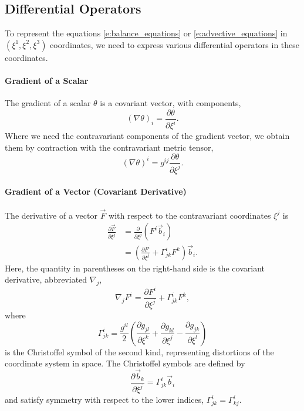 \documentclass{report}
\begin{document}
\subsection{Differential Operators}

To represent the equations \eqref{e:balance_equations} or \eqref{e:advective_equations} in $(\xi^1, \xi^2, \xi^3)$ coordinates, we need to express various differential operators in these coordinates. 

\paragraph{Gradient of a Scalar} The gradient of a scalar $\theta$ is a covariant vector, with components,
\[
(\nabla \theta)_i = \frac{\partial \theta}{\partial \xi^i}.
\]
Where we need the contravariant components of the gradient vector, we obtain them by contraction with the contravariant metric tensor,
\[
(\nabla \theta)^i = g^{ij} \frac{\partial \theta}{\partial \xi^j}.
\]

\paragraph{Gradient of a Vector (Covariant Derivative)} The derivative of a vector $\vec{F}$ with respect to the contravariant coordinates $\xi^j$ is
\begin{equation}
\begin{split}
\frac{\partial \vec{F}}{\partial \xi^j} & = \frac{\partial}{\partial \xi^j} (F^i \vec{b}_i)\\
& = \left( \frac{\partial F^i}{\partial \xi^j} +  \Gamma^i_{jk} F^k \right) \vec{b}_i.
\end{split}
\end{equation}
Here, the quantity in parentheses on the right-hand side is the covariant derivative, abbreviated $\nabla_j$,
\begin{equation}
    \nabla_j F^i = \frac{\partial F^i}{\partial \xi^j} +  \Gamma^i_{jk} F^k,
\end{equation}
where
\[
\Gamma^i_{jk} = \frac{g^{il}}{2} \left( \frac{\partial g_{jl}}{\partial \xi^k} + \frac{\partial g_{kl}}{\partial \xi^j} - \frac{\partial g_{jk}}{\partial \xi^l} \right)
\]
is the Christoffel symbol of the second kind, representing distortions of the coordinate system in space. The Christoffel symbols are defined by
\[
\frac{\partial\vec{b}_k}{\partial \xi^{j}} = \Gamma^{i}_{jk} \vec{b}_i
\]
and satisfy symmetry with respect to the lower indices, $\Gamma^{i}_{jk} = \Gamma^{i}_{kj}$.
\end{document}
